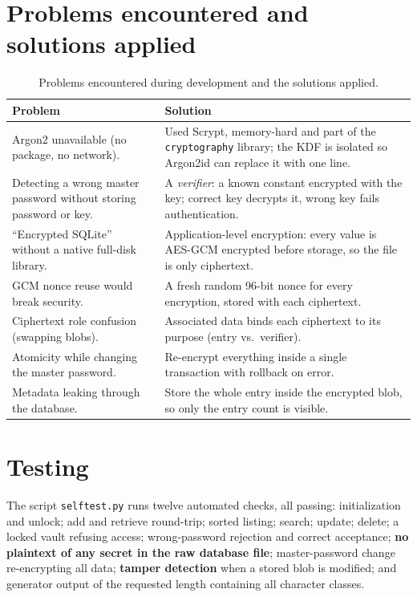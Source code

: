 \documentclass[11pt,a4paper]{article}
\begin{document}
\section{Problems encountered and solutions applied}

\begin{table}[H]
\centering
\renewcommand{\arraystretch}{1.4}
\begin{tabularx}{\textwidth}{@{}XX@{}}
\toprule
\textbf{Problem} & \textbf{Solution} \\
\midrule
Argon2 unavailable (no package, no network). & Used Scrypt, memory-hard and part of the \texttt{cryptography} library; the KDF is isolated so Argon2id can replace it with one line. \\
Detecting a wrong master password without storing password or key. & A \emph{verifier}: a known constant encrypted with the key; correct key decrypts it, wrong key fails authentication. \\
``Encrypted SQLite'' without a native full-disk library. & Application-level encryption: every value is AES-GCM encrypted before storage, so the file is only ciphertext. \\
GCM nonce reuse would break security. & A fresh random 96-bit nonce for every encryption, stored with each ciphertext. \\
Ciphertext role confusion (swapping blobs). & Associated data binds each ciphertext to its purpose (entry vs.\ verifier). \\
Atomicity while changing the master password. & Re-encrypt everything inside a single transaction with rollback on error. \\
Metadata leaking through the database. & Store the whole entry inside the encrypted blob, so only the entry count is visible. \\
\bottomrule
\end{tabularx}
\caption{Problems encountered during development and the solutions applied.}
\end{table}

\section{Testing}
The script \texttt{selftest.py} runs twelve automated checks, all passing:
initialization and unlock; add and retrieve round-trip; sorted listing; search;
update; delete; a locked vault refusing access; wrong-password rejection and
correct acceptance; \textbf{no plaintext of any secret in the raw database
file}; master-password change re-encrypting all data; \textbf{tamper detection}
when a stored blob is modified; and generator output of the requested length
containing all character classes.
\end{document}
